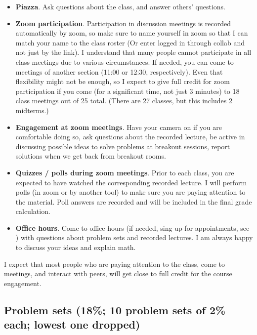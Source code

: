 \documentclass[oneside,11pt]{amsart}
\begin{document}
\begin{itemize}
	\item \textbf{Piazza}. Ask questions about the class, and answer others' questions.
	\item \textbf{Zoom participation}. Participation in discussion meetings is recorded automatically by zoom, 
		so make sure to name yourself in zoom so that I can match your name to the class roster
		(Or enter logged in through collab and not just by the link).
		I understand that many people cannot participate in all class meetings due to various
		circumstances. If needed,
		you can come to meetings of another section (11:00 or 12:30, respectively).
		Even that flexibility might not be enough, so I expect to give full credit for zoom participation 
		if you come (for a significant time, not just 3 minutes) to 18 class meetings out of 25 total.
		(There are 27 classes, but this includes 2 midterms.)
	\item \textbf{Engagement at zoom meetings}. 
		Have your camera on if you are comfortable doing so,
		ask questions about the recorded
		lecture, be active in discussing possible ideas to solve problems at breakout sessions, 
		report solutions when we get back from breakout rooms.
	\item \textbf{Quizzes / polls during zoom meetings}. 
		Prior to each class, you are expected to have watched the corresponding recorded lecture.
		I will perform polls (in zoom or by another tool)
		to make sure you are paying attention to the material. 
		Poll answers are recorded and will be included in the final grade calculation.
	\item \textbf{Office hours}. Come to office hours (if needed, 
		sing up for appointments, see ) 
		with questions about problem sets and recorded lectures.
		I am always happy to discuss your ideas and explain math.
\end{itemize}

I expect that most people who are paying attention to the class,
come to meetings, and interact with peers, will get close to full credit for
the course engagement.

\subsection{Problem sets (18\%; 10 problem sets of 2\% each; lowest one dropped)}
\end{document}
